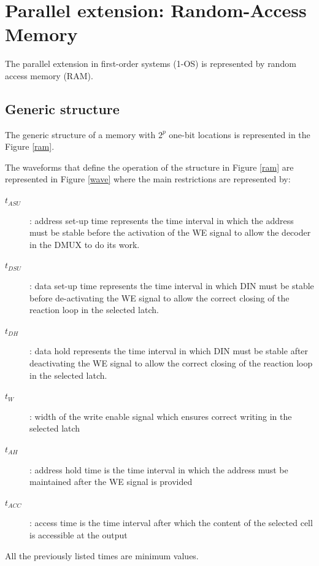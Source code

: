\section{Parallel extension: Random-Access Memory}

The parallel extension in first-order systems (1-OS) is represented by random access memory (RAM).

\subsection{Generic structure}

The generic structure of a memory with $2^p$ one-bit locations is represented in the Figure \ref{ram}.




The waveforms that define the operation of the structure in Figure \ref{ram} are represented in Figure \ref{wave} where the main restrictions are represented by:
\begin{description}
    \item[$t_{ASU}$]: address set-up time represents the time interval in which the address must be stable before the activation of the WE signal to allow the decoder in the DMUX to do its work.
    \item[$t_{DSU}$]: data set-up time represents the time interval in which DIN must be stable before de-activating the WE signal to allow the correct closing of the reaction loop in the selected latch.
    \item[$t_{DH}$]: data hold represents the time interval in which DIN must be stable after deactivating the WE signal to allow the correct closing of the reaction loop in the selected latch.
    \item[$t_{W}$]: width of the write enable signal which ensures correct writing in the selected latch
    \item[$t_{AH}$]: address hold time is the time interval in which the address must be maintained after the WE signal is provided
    \item[$t_{ACC}$]: access time is the time interval after which the content of the selected cell is accessible at the output
\end{description}
All the previously listed times are minimum values.

